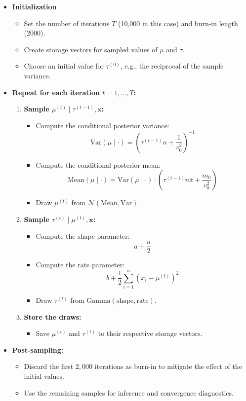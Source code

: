 \documentclass[]{article}
\begin{document}
\begin{itemize}
	\item \textbf{Initialization}
	\begin{itemize}
		\item Set the number of iterations $T$ (10,000 in this case) and burn-in length (2000).
		\item Create storage vectors for sampled values of $\mu$ and $\tau$.
		\item Choose an initial value for $\tau^{(0)}$, e.g., the reciprocal of the sample variance.
	\end{itemize}
	
	\item \textbf{Repeat for each iteration $t = 1, \dots, T$:}
	\begin{enumerate}
		\item \textbf{Sample $\mu^{(t)} \mid \tau^{(t-1)}, \mathbf{x}$:}
		\begin{itemize}
			\item Compute the conditional posterior variance:
			$$
			\text{Var}(\mu \mid \cdot) = \left( \tau^{(t-1)} n + \frac{1}{v_0^2} \right)^{-1}
			$$
			\item Compute the conditional posterior mean:
			$$
			\text{Mean}(\mu \mid \cdot) = \text{Var}(\mu \mid \cdot) \cdot \left( \tau^{(t-1)} n \bar{x} + \frac{m_0}{v_0^2} \right)
			$$
			\item Draw $\mu^{(t)}$ from $\mathcal{N}(\text{Mean}, \text{Var})$.
		\end{itemize}
		
		\item \textbf{Sample $\tau^{(t)} \mid \mu^{(t)}, \mathbf{x}$:}
		\begin{itemize}
			\item Compute the shape parameter:
			$$
			a + \frac{n}{2}
			$$
			\item Compute the rate parameter:
			$$
			b + \frac{1}{2} \sum_{i=1}^n (x_i - \mu^{(t)})^2
			$$
			\item Draw $\tau^{(t)}$ from $\text{Gamma}(\text{shape}, \text{rate})$.
		\end{itemize}
		
		\item \textbf{Store the draws:}
		\begin{itemize}
			\item Save $\mu^{(t)}$ and $\tau^{(t)}$ to their respective storage vectors.
		\end{itemize}
	\end{enumerate}
	
	\item \textbf{Post-sampling:}
	\begin{itemize}
		\item Discard the first $2{,}000$ iterations as burn-in to mitigate the effect of the initial values.
		\item Use the remaining samples for inference and convergence diagnostics.
	\end{itemize}
\end{itemize}
\end{document}
